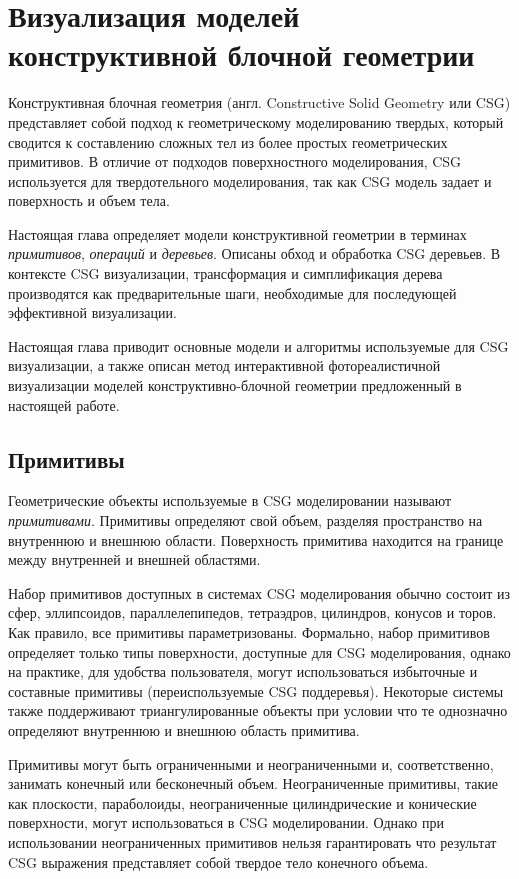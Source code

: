 \chapter{Визуализация моделей конструктивной блочной геометрии} \label{chapt2}

Конструктивная блочная геометрия (англ. Constructive Solid Geometry или CSG) \cite{Requicha80} представляет собой подход к геометрическому моделированию твердых, который сводится к составлению сложных тел из более простых геометрических примитивов. В отличие от подходов поверхностного моделирования, CSG используется для твердотельного моделирования, так как CSG модель задает и поверхность и объем тела.

Настоящая глава определяет модели конструктивной геометрии в терминах \textit{примитивов}, \textit{операций} и \textit{деревьев}. Описаны обход и обработка CSG деревьев. В контексте CSG визуализации, трансформация и симплификация дерева производятся как предварительные шаги, необходимые для последующей эффективной визуализации.

Настоящая глава приводит основные модели и алгоритмы используемые для CSG визуализации, а также описан метод интерактивной фотореалистичной визуализации моделей конструктивно-блочной геометрии предложенный в настоящей работе.


\section{Примитивы} \label{sect_primitives}

Геометрические объекты используемые в CSG моделировании называют \textit{примитивами}. Примитивы определяют свой объем, разделяя пространство на внутреннюю и внешнюю области. Поверхность примитива находится на границе между внутренней и внешней областями.

Набор примитивов доступных в системах CSG моделирования обычно состоит из сфер, эллипсоидов, параллелепипедов, тетраэдров, цилиндров, конусов и торов. Как правило, все примитивы параметризованы. Формально, набор примитивов определяет только типы поверхности, доступные для CSG моделирования, однако на практике, для удобства пользователя, могут использоваться избыточные и составные примитивы (переиспользуемые CSG поддеревья). Некоторые системы также поддерживают триангулированные объекты при условии что те однозначно определяют внутреннюю и внешнюю область примитива.

Примитивы могут быть ограниченными и неограниченными и, соответственно, занимать конечный или бесконечный объем. Неограниченные примитивы, такие как плоскости, параболоиды, неограниченные цилиндрические и конические поверхности, могут использоваться в CSG моделировании. Однако при использовании неограниченных примитивов нельзя гарантировать что результат CSG выражения представляет собой твердое тело конечного объема.

